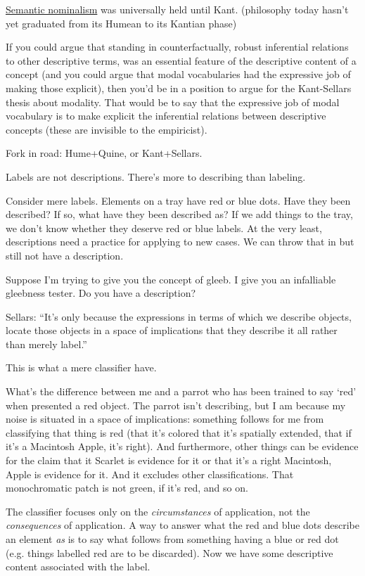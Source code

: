 \href{doc/phil/People/Brandom/On Sellars/Lectures 2009/4 Lecture: Counterfactuals and Kant Sellars Thesis/6 Semantic Nominalism}{Semantic nominalism} was universally held until Kant. (philosophy today hasn't yet graduated from its Humean to its Kantian phase)

If you could argue that standing in counterfactually, robust inferential relations to other descriptive terms, was an essential feature of the descriptive content of a concept (and you could argue that modal vocabularies had the expressive job of making those explicit), then you'd be in a position to argue for the Kant-Sellars thesis about modality. That would be to say that the expressive job of modal vocabulary is to make explicit the inferential relations between descriptive concepts (these are invisible to the empiricist).

Fork in road: Hume+Quine, or Kant+Sellars.

Labels are not descriptions. There's more to describing than labeling.

Consider mere labels. Elements on a tray have red or blue dots. Have they been described? If so, what have they been described as? If we add things to the tray, we don't know whether they deserve red or blue labels. At the very least, descriptions need a practice for applying to new cases. We can throw that in but still not have a description.

Suppose I'm trying to give you the concept of gleeb. I give you an infalliable gleebness tester. Do you have a description?

Sellars: ``It's only because the expressions in terms of which we describe objects, locate those objects in a space of implications that they describe it all rather than merely label.''

This is what a mere classifier have.

What's the difference between me and a parrot who has been trained to say `red' when presented a red object. The parrot isn't describing, but I am because my noise is situated in a space of implications: something follows for me from classifying that thing is red (that it's colored that it's spatially extended, that if it's a Macintosh Apple, it's right). And furthermore, other things can be evidence for the claim that it Scarlet is evidence for it or that it's a right Macintosh, Apple is evidence for it. And it excludes other classifications. That monochromatic patch is not green, if it's red, and so on.

The classifier focuses only on the \emph{circumstances} of application, not the \emph{consequences} of application. A way to answer what the red and blue dots describe an element \emph{as} is to say what follows from something having a blue or red dot (e.g. things labelled red are to be discarded). Now we have some descriptive content associated with the label.

